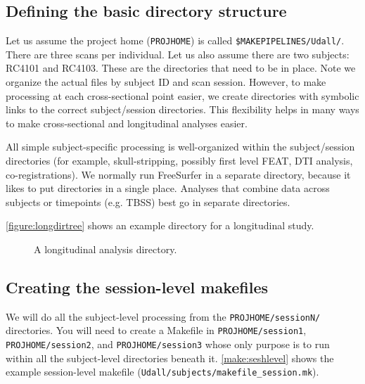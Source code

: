 \subsection{Defining the basic directory structure}
Let us assume the project home (\texttt{PROJHOME}) is called \texttt{\$MAKEPIPELINES/Udall/}. There are three scans per individual. Let us also assume there are two subjects: RC4101 and RC4103. These are the directories that need to be in place. Note we organize the actual files by subject ID and scan session. However, to make processing at each cross-sectional point easier, we create directories with symbolic links to the correct subject/session directories. This flexibility helps in many ways to make cross-sectional and longitudinal analyses easier.

All simple subject-specific processing is well-organized within the subject/session directories (for example, skull-stripping, possibly first level FEAT, DTI analysis, co-registrations). We normally run FreeSurfer in a separate directory, because it likes to put directories in a single place. Analyses that combine data across subjects or timepoints (e.g. TBSS) best go in separate directories.

\autoref{figure:longdirtree} shows an example directory for a longitudinal study.

\begin{center}
	\begin{figure}
	\caption{A longitudinal analysis directory.}
	\label{figure:longdirtree}
	\end{figure}
\end{center}

\subsection{Creating the session-level makefiles}
We will do all the subject-level processing from the \texttt{PROJHOME/sessionN/} directories. You will need to create a Makefile in \texttt{PROJHOME/session1}, \texttt{PROJHOME/session2}, and \texttt{PROJHOME/session3} whose only purpose is to run \maken{} within all the subject-level directories beneath it.  
\autoref{make:seshlevel} shows the example session-level makefile (\texttt{Udall/subjects/makefile_session.mk}).

